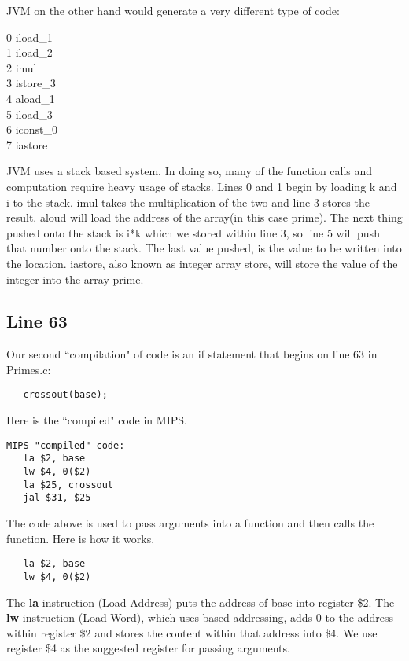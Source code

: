 \documentclass[11pt]{article}
\newenvironment{myindentpar}[1]
{\begin{list}{} 
{\setlength{\leftmargin}{#1}}\item[]}
{\end{list}}
\begin{document}
JVM on the other hand would generate a very different type of code:

\begin{myindentpar}{.4 in}
0 iload\_1
\\1  iload\_2
\\2  imul
\\3  istore\_3
\\4  aload\_1
\\5  iload\_3
\\6  iconst\_0
\\7  iastore
\end{myindentpar}

JVM uses a stack based system. In doing so, many of the function calls and computation require heavy usage of stacks. Lines 0 and 1 begin by loading k and i to the stack. imul takes the multiplication of the two and line 3 stores the result. aloud will load the address of the array(in this case prime). The next thing pushed onto the stack is i*k which we stored within line 3, so line 5 will push that number onto the stack. The last value pushed, is the value to be written into the location. iastore, also known as integer array store, will store the value of the integer into the array prime.

\subsection{Line 63}
Our second ``compilation" of code is an if statement that begins on line 63 in Primes.c:
\begin{verbatim}
   crossout(base);
\end{verbatim}

Here is the ``compiled" code in MIPS.

\begin{verbatim}
MIPS "compiled" code:
   la $2, base
   lw $4, 0($2)
   la $25, crossout
   jal $31, $25
\end{verbatim}

The code above is used to pass arguments into a function and then calls the function. Here is how it works. 

\begin{verbatim}
   la $2, base
   lw $4, 0($2)
\end{verbatim}

The {\bf la} instruction (Load Address) puts the address of base into register \$2. The {\bf lw} instruction (Load Word), which uses based addressing, adds 0 to the address within register \$2 and stores the content within that address into \$4. We use register \$4 as the suggested register for passing arguments.
\end{document}
